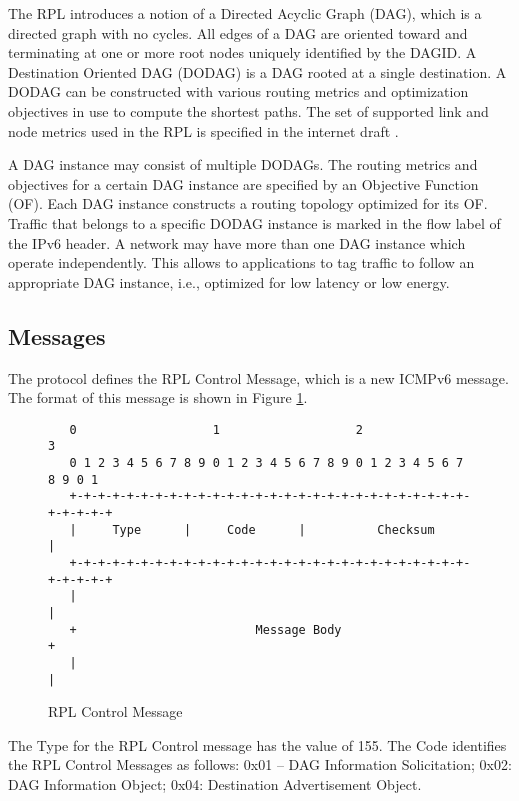 The RPL introduces a notion of a Directed Acyclic Graph (DAG), which is a directed graph with no cycles. All edges of a DAG are oriented toward and terminating at one or more root nodes uniquely identified by the DAGID. A Destination Oriented DAG (DODAG) is a DAG rooted at a single destination. A DODAG can be constructed with various routing metrics and optimization objectives in use to compute the shortest paths. The set of supported link and node metrics used in the RPL is specified in the internet draft \cite{draft-routing-metrics-04}. 

A DAG instance may consist of multiple DODAGs. The routing metrics and objectives for a certain DAG instance are specified by an Objective Function (OF). Each DAG instance constructs a routing topology optimized for its OF. Traffic that belongs to a specific DODAG instance is marked in the flow label of the IPv6 header. A network may have more than one DAG instance which operate independently. This allows to applications to tag traffic to follow an appropriate DAG instance, i.e., optimized for low latency or low energy.  

\subsection{Messages}
The protocol defines the RPL Control Message, which is a new ICMPv6 message. The format of this message is shown in Figure \ref{fig:rpl.control.message}.
\begin{figure}[htp]
\begin{mylisting}
\begin{verbatim}
   0                   1                   2                   3
   0 1 2 3 4 5 6 7 8 9 0 1 2 3 4 5 6 7 8 9 0 1 2 3 4 5 6 7 8 9 0 1
   +-+-+-+-+-+-+-+-+-+-+-+-+-+-+-+-+-+-+-+-+-+-+-+-+-+-+-+-+-+-+-+-+
   |     Type      |     Code      |          Checksum             |
   +-+-+-+-+-+-+-+-+-+-+-+-+-+-+-+-+-+-+-+-+-+-+-+-+-+-+-+-+-+-+-+-+
   |                                                               |
   +                         Message Body                          +
   |                                                               |
\end{verbatim}
\end{mylisting}
\caption{RPL Control Message}\label{fig:rpl.control.message}
\end{figure}

The Type for the RPL Control message has the value of 155. The Code identifies the RPL Control Messages as follows:  0x01 -- DAG Information Solicitation; 0x02: DAG Information Object; 0x04: Destination Advertisement Object. 

